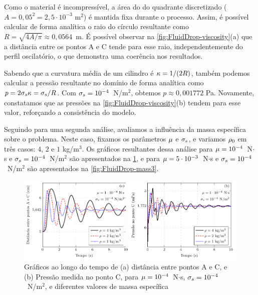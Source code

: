 \documentclass[Tese.tex]{subfiles}
\begin{document}
Como o material é incompressível, a área do do quadrante discretizado ($A=0,05^2 = 2,5\cdot 10^{-3}$ m$^2$) é mantida fixa durante o processo. Assim, é possível calcular de forma analítica o raio do círculo resultante como $R=\sqrt{4A/\pi}\approx 0,0564$~m. É possível observar na \cref{fig:FluidDrop-viscosity}(a) que a distância entre os pontos A e C tende para esse raio, independentemente do perfil oscilatório, o que demonstra uma coerência nos resultados.

Sabendo que a curvatura média de um cilindro é $\kappa = 1/(2R)$, também podemos calcular a pressão resultante no domínio de forma analítica como $p = 2\sigma_s\kappa = \sigma_s/R$. Com $\sigma_s = 10^{-4}$~N/m$^2$, obtemos $p \approx 0,001772$ Pa. Novamente, constatamos que as pressões na \cref{fig:FluidDrop-viscosity}(b) tendem para esse valor, reforçando a consistência do modelo.


Seguindo para uma segunda análise, avaliamos a influência da massa específica sobre o problema. Neste caso, fixamos os parâmetros $\mu$ e $\sigma_s$, e variamos $\rho_0$ em três casos: $4$, $2$ e $1$ kg/m$^3$. Os gráficos resultantes dessa análise para $\mu = 10^{-4}$~N$\cdot$s e $\sigma_s = 10^{-4}$~N/m$^2$ são apresentados na \cref{fig:FluidDrop-mass}, e para $\mu = 5\cdot 10^{-3}$~N$\cdot$s e $\sigma_s = 10^{-4}$~N/m$^2$ são apresentados na \cref{fig:FluidDrop-mass3}. 

\begin{figure}[!htb]
	\centering
	\caption{Gráficos ao longo do tempo de (a) distância entre pontos A e C, e (b) Pressão medida no ponto C, para $\mu = 10^{-4}$~N$\cdot$s, $\sigma_s = 10^{-4}$~N/m$^2$, e diferentes valores de massa específica}
	\label{fig:FluidDrop-mass}
	\includegraphics[scale=1.0]{Figuras/SurfaceTension2D/SurfaceTension2D-mass.pdf}
\end{figure}
\end{document}

